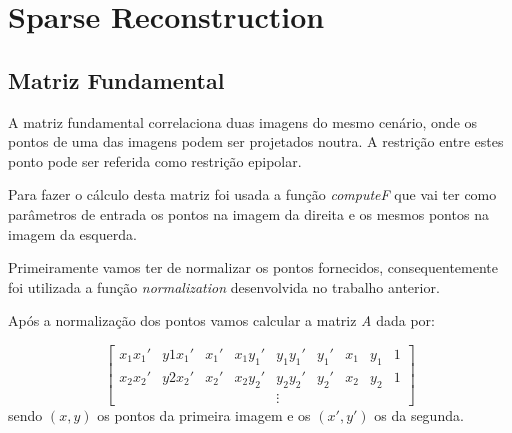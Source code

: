 \documentclass[journal]{IEEEtran}
\begin{document}
\section{Sparse Reconstruction}
\subsection*{Matriz Fundamental}
\par A matriz fundamental correlaciona duas imagens do mesmo cenário, onde os pontos de uma das imagens podem ser projetados noutra. A restrição entre estes ponto pode ser referida como restrição epipolar.
\par Para fazer o cálculo desta matriz foi usada a função \textit{computeF} que vai ter como parâmetros de entrada os pontos na imagem da direita e os mesmos pontos na imagem da esquerda.
\par Primeiramente vamos ter de normalizar os pontos fornecidos, consequentemente foi utilizada a função \textit{normalization} desenvolvida no trabalho anterior.
\par Após a normalização dos pontos vamos calcular a matriz \textit{A} dada por:

\begin{equation}
    \begin{bmatrix}
    x_1x_1' & y1x_1' & x_1' & x_1y_1' & y_1y_1' & y_1' & x_1 & y_1 & 1 \\
    x_2x_2' & y2x_2' & x_2' & x_2y_2' & y_2y_2' & y_2' & x_2 & y_2 & 1 \\
            &        &      &         &    \vdots     &      &     &     &
    \end{bmatrix}
\end{equation}
sendo $(x,y)$ os pontos da primeira imagem e os $(x',y')$ os da segunda.
\end{document}
